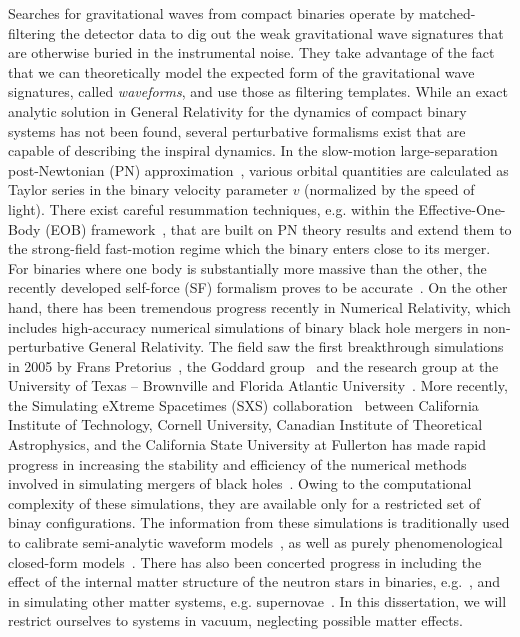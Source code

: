 Searches for gravitational waves from compact binaries operate by 
matched-filtering the detector data to dig out the weak gravitational wave
signatures that are otherwise buried in the instrumental noise. They take 
advantage of the fact that we can theoretically model the expected form of the 
gravitational wave signatures, called \textit{waveforms}, and use those 
as filtering templates. While an exact analytic solution in General Relativity
for the dynamics of compact binary systems has not been found, several perturbative
formalisms exist that are capable of describing the inspiral dynamics.
In the slow-motion large-separation post-Newtonian (PN) 
approximation~\cite{PNtheoryLivingReviewBlanchet},
various orbital quantities are calculated as Taylor series in the binary 
velocity parameter $v$ (normalized by the speed of light). 
There exist careful resummation techniques, e.g. within the Effective-One-Body
(EOB) framework~\cite{EOBOriginalBuonannoDamour}, 
that are built on PN theory results and extend them to the
strong-field fast-motion regime which the binary enters close to its merger.
For binaries where one body is substantially more massive than the other, 
the recently developed self-force (SF) formalism proves to be 
accurate~\cite{grallaI,grallaII}. 
On the other hand, there has been tremendous progress recently in Numerical
Relativity, which includes high-accuracy numerical simulations of binary black
hole mergers in non-perturbative General Relativity. The field saw the first
breakthrough simulations in 2005 by Frans Pretorius~\cite{Pretorius2005,
Pretorius2006}, the Goddard group~\cite{Campanelli:2005dd} and the research
group at the University of Texas -- Brownville and Florida Atlantic 
University~\cite{Campanelli:2005dd}. More recently, the Simulating eXtreme
Spacetimes (SXS) collaboration~\cite{SXSWebsite} between California Institute
of Technology, Cornell University, Canadian Institute of Theoretical 
Astrophysics, and the California State University at Fullerton has made rapid
progress in increasing the stability and efficiency of the numerical 
methods involved in simulating mergers of black holes~\cite{Mroue:2013xna}.
Owing to the computational complexity of these simulations, they are available 
only for a restricted set of binay configurations. 
The information from these simulations is traditionally used to calibrate
semi-analytic waveform models~\cite{BuonannoEOBv2Main}, as well as purely
phenomenological closed-form models~\cite{Santamaria:2010yb}. 
There has also been concerted progress in including the effect of the 
internal matter structure of the neutron stars in binaries, 
e.g.~\cite{Deaton:2013sla}, and in simulating other matter systems,
e.g. supernovae~\cite{Mosta:2014jaa}.
In this dissertation, we will restrict ourselves to systems in vacuum, 
neglecting possible matter effects. 

